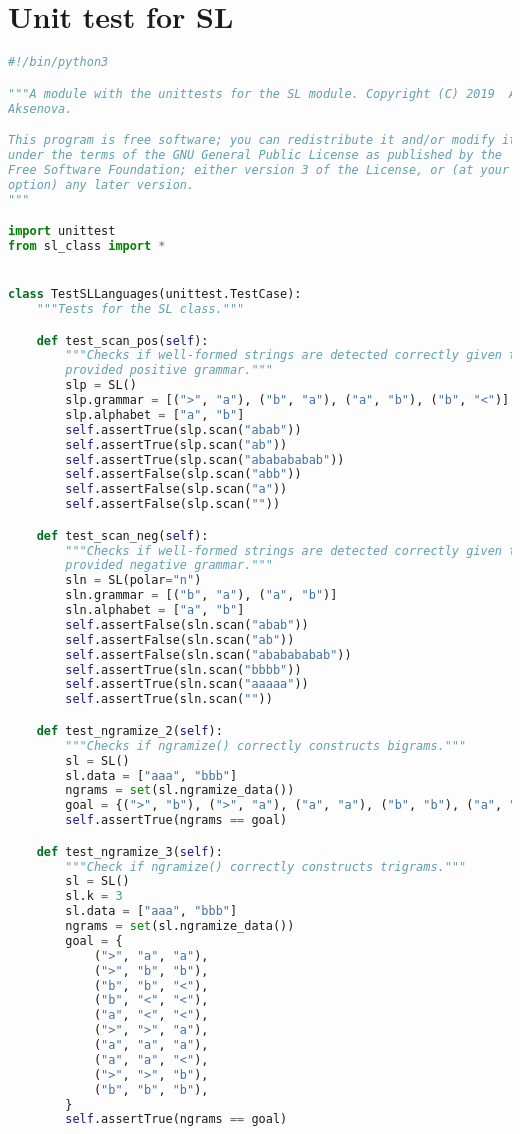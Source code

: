 \section{Unit test for SL}

\begin{lstlisting}[language=Python]
#!/bin/python3

"""A module with the unittests for the SL module. Copyright (C) 2019  Alena
Aksenova.

This program is free software; you can redistribute it and/or modify it
under the terms of the GNU General Public License as published by the
Free Software Foundation; either version 3 of the License, or (at your
option) any later version.
"""

import unittest
from sl_class import *


class TestSLLanguages(unittest.TestCase):
    """Tests for the SL class."""

    def test_scan_pos(self):
        """Checks if well-formed strings are detected correctly given the
        provided positive grammar."""
        slp = SL()
        slp.grammar = [(">", "a"), ("b", "a"), ("a", "b"), ("b", "<")]
        slp.alphabet = ["a", "b"]
        self.assertTrue(slp.scan("abab"))
        self.assertTrue(slp.scan("ab"))
        self.assertTrue(slp.scan("ababababab"))
        self.assertFalse(slp.scan("abb"))
        self.assertFalse(slp.scan("a"))
        self.assertFalse(slp.scan(""))

    def test_scan_neg(self):
        """Checks if well-formed strings are detected correctly given the
        provided negative grammar."""
        sln = SL(polar="n")
        sln.grammar = [("b", "a"), ("a", "b")]
        sln.alphabet = ["a", "b"]
        self.assertFalse(sln.scan("abab"))
        self.assertFalse(sln.scan("ab"))
        self.assertFalse(sln.scan("ababababab"))
        self.assertTrue(sln.scan("bbbb"))
        self.assertTrue(sln.scan("aaaaa"))
        self.assertTrue(sln.scan(""))

    def test_ngramize_2(self):
        """Checks if ngramize() correctly constructs bigrams."""
        sl = SL()
        sl.data = ["aaa", "bbb"]
        ngrams = set(sl.ngramize_data())
        goal = {(">", "b"), (">", "a"), ("a", "a"), ("b", "b"), ("a", "<"), ("b", "<")}
        self.assertTrue(ngrams == goal)

    def test_ngramize_3(self):
        """Check if ngramize() correctly constructs trigrams."""
        sl = SL()
        sl.k = 3
        sl.data = ["aaa", "bbb"]
        ngrams = set(sl.ngramize_data())
        goal = {
            (">", "a", "a"),
            (">", "b", "b"),
            ("b", "b", "<"),
            ("b", "<", "<"),
            ("a", "<", "<"),
            (">", ">", "a"),
            ("a", "a", "a"),
            ("a", "a", "<"),
            (">", ">", "b"),
            ("b", "b", "b"),
        }
        self.assertTrue(ngrams == goal)


\end{lstlisting}
